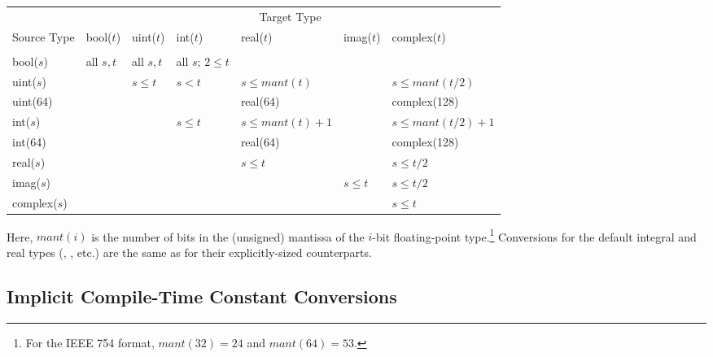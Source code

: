 \begin{center}
\begin{tabular}{l|llllll}
& \multicolumn{6}{c}{Target Type} \\ [4pt]

Source Type  & bool($t$) & uint($t$) & int($t$) & real($t$) & imag($t$) & complex($t$) \\  [3pt]

\cline{1-7} \\

bool($s$)    & all $s,t$ & all $s,t$   & all $s$; $2 \le t$ & & & \\ [7pt]

uint($s$)    & & $s \le t$ & $s < t$   & $s \le mant(t)$   & & $s \le mant(t/2)$   \\ [7pt]

uint(64)     & &           &           & real(64)          & & complex(128)        \\ [7pt]

int($s$)     & &           & $s \le t$ & $s \le mant(t)+1$ & & $s \le mant(t/2)+1$ \\ [7pt]

int(64)      & &           &           & real(64)          & & complex(128)        \\ [7pt]

real($s$)    & & & & $s \le t$ &           & $s \le t/2$ \\ [7pt]

imag($s$)    & & & &           & $s \le t$ & $s \le t/2$ \\ [7pt]

complex($s$) & & & &           &           & $s \le t$   \\ [5pt]

\end{tabular}
\end{center}
Here, $mant(i)$ is the number of bits in the (unsigned) mantissa of
the $i$-bit floating-point type.\footnote{For the IEEE 754 format,
$mant(32)=24$ and $mant(64)=53$.}
%
Conversions for the default integral and real types (,
, etc.) are the same as for their
explicitly-sized counterparts.

\subsection{Implicit Compile-Time Constant Conversions}
\label{Implicit_Compile_Time_Constant_Conversions}

